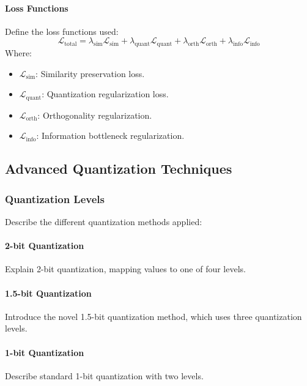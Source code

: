 \paragraph{Loss Functions}  
Define the loss functions used:  
\begin{equation}  
\mathcal{L}_{\text{total}} = \lambda_{\text{sim}}\mathcal{L}_{\text{sim}} + \lambda_{\text{quant}}\mathcal{L}_{\text{quant}} + \lambda_{\text{orth}}\mathcal{L}_{\text{orth}} + \lambda_{\text{info}}\mathcal{L}_{\text{info}}  
\end{equation}  
Where:  
\begin{itemize}  
    \item $\mathcal{L}_{\text{sim}}$: Similarity preservation loss.  
    \item $\mathcal{L}_{\text{quant}}$: Quantization regularization loss.  
    \item $\mathcal{L}_{\text{orth}}$: Orthogonality regularization.  
    \item $\mathcal{L}_{\text{info}}$: Information bottleneck regularization.  
\end{itemize}  
  
\subsection{Advanced Quantization Techniques}  
\label{sec:quantization}  
  
\subsubsection{Quantization Levels}  
Describe the different quantization methods applied:  
  
\paragraph{2-bit Quantization}  
Explain 2-bit quantization, mapping values to one of four levels.  
  
\paragraph{1.5-bit Quantization}  
Introduce the novel 1.5-bit quantization method, which uses three quantization levels.  
  
\paragraph{1-bit Quantization}  
Describe standard 1-bit quantization with two levels.  
  
